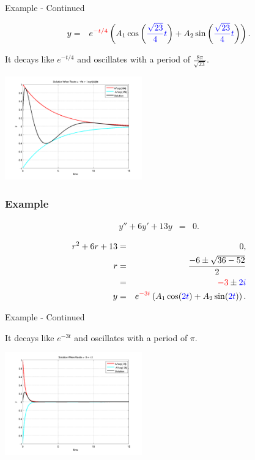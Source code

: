 \begin{frame}{Example - Continued}

    \begin{eqnarray*}
      y & = & e^{{\color{red}-t/4}} 
      \left( A_1 \cos\left( {\color{blue}\frac{\sqrt{23}}{4} t} \right) + A_2 \sin\left( {\color{blue}\frac{\sqrt{23}}{4} t} \right) \right).
    \end{eqnarray*}


    It decays like $e^{-t/4}$ and oscillates with a period of $\frac{8\pi}{\sqrt{23}}$.

    \centerline{\includegraphics[height=12em]{img/decayOfConstantCoeffI}}
  
\end{frame}


\begin{frame}
  \frametitle{Example}

  \begin{eqnarray*}
    y'' + 6 y' + 13y & = & 0.
  \end{eqnarray*}

  {
    \begin{eqnarray*}
      r^2 + 6r + 13 & = & 0, \\
      r & = & \frac{-6\pm\sqrt{36-52}}{2} \\
      & = & {\color{red}-3} \pm {\color{blue}2i} \\
      y & = & e^{{\color{red}-3t}} \left( A_1 \cos({\color{blue}2t}) + A_2 \sin({\color{blue}2t}) \right).
    \end{eqnarray*}
  }

\end{frame}

\begin{frame}{Example - Continued}

    It decays like $e^{-3t}$ and oscillates with a period of $\pi$.

    \centerline{\includegraphics[height=12em]{img/decayOfConstantCoeffII}}
  
\end{frame}


